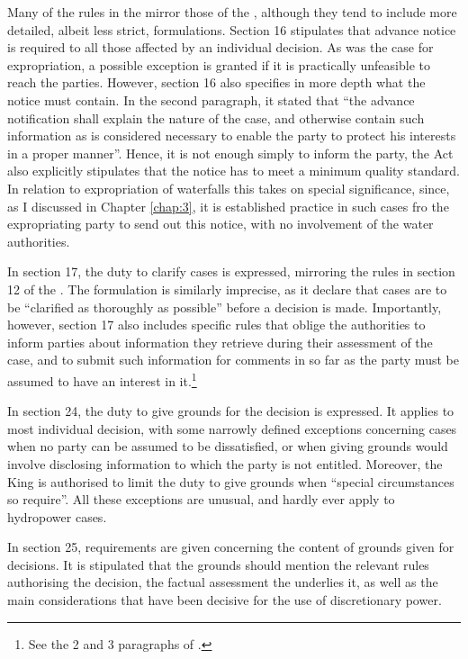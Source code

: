 Many of the rules in the \cite{paa67} mirror those of the \cite{ea59}, although they tend to include more detailed, albeit less strict, formulations. Section 16 stipulates that advance notice is required to all those affected by an individual decision. As was the case for expropriation, a possible exception is granted if it is practically unfeasible to reach the parties. However, section 16 also specifies in more depth what the notice must contain. In the second paragraph, it stated that ``the advance notification shall explain the nature of the case, and otherwise contain such information as is considered necessary to enable the party to protect his interests in a proper manner''. Hence, it is not enough simply to inform the party, the Act also explicitly stipulates that the notice has to meet a minimum quality standard. In relation to expropriation of waterfalls this takes on special significance, since, as I discussed in Chapter \ref{chap:3}, it is established practice in such cases fro the expropriating party to send out this notice, with no involvement of the water authorities. 

In section 17, the duty to clarify cases is expressed, mirroring the rules in section 12 of the \cite{ea59}. The formulation is similarly imprecise, as it declare that cases are to be ``clarified as thoroughly as possible'' before a decision is made. Importantly, however, section 17 also includes specific rules that oblige the authorities to inform parties about information they retrieve during their assessment of the case, and to submit such information for comments in so far as the party must be assumed to have an interest in it.\footnote{See the 2 and 3 paragraphs of \cite[17]{paa67}.}

In section 24, the duty to give grounds for the decision is expressed. It applies to most individual decision, with some narrowly defined exceptions concerning cases when no party can be assumed to be dissatisfied, or when giving grounds would involve disclosing information to which the party is not entitled. Moreover, the King is authorised to limit the duty to give grounds when ``special circumstances so require''. All these exceptions are unusual, and hardly ever apply to hydropower cases.

In section 25, requirements are given concerning the content of grounds given for decisions. It is stipulated that the grounds should mention the relevant rules authorising the decision, the factual assessment the underlies it, as well as the main considerations that have been decisive for the use of discretionary power. 

